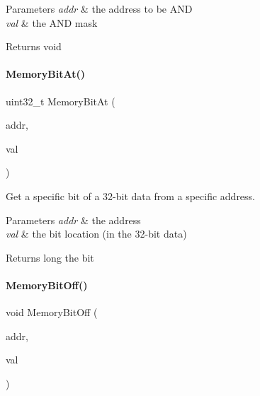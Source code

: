 \begin{DoxyParams}{Parameters}
{\em addr} & the address to be A\+ND \\
\hline
{\em val} & the A\+ND mask \\
\hline
\end{DoxyParams}
\begin{DoxyReturn}{Returns}
void 
\end{DoxyReturn}
\mbox{\label{a00020_aaa87daf3a7b5e127c21919e520e58282}} 
\paragraph{\texorpdfstring{Memory\+Bit\+At()}{MemoryBitAt()}}
{\footnotesize\ttfamily uint32\+\_\+t Memory\+Bit\+At (\begin{DoxyParamCaption}\item[{\mbox{\hyperlink{a00020_a06da901348542a481c297d9b700e2001}{memory\+\_\+addr\+\_\+t}}}]{addr,  }\item[{uint32\+\_\+t}]{val }\end{DoxyParamCaption})\hspace{0.3cm}{\ttfamily [inline]}}



Get a specific bit of a 32-\/bit data from a specific address. 


\begin{DoxyParams}{Parameters}
{\em addr} & the address \\
\hline
{\em val} & the bit location (in the 32-\/bit data) \\
\hline
\end{DoxyParams}
\begin{DoxyReturn}{Returns}
long the bit 
\end{DoxyReturn}
\mbox{\label{a00020_a29fb2c978051c0cff760432e2378f3a3}} 
\paragraph{\texorpdfstring{Memory\+Bit\+Off()}{MemoryBitOff()}}
{\footnotesize\ttfamily void Memory\+Bit\+Off (\begin{DoxyParamCaption}\item[{\mbox{\hyperlink{a00020_a06da901348542a481c297d9b700e2001}{memory\+\_\+addr\+\_\+t}}}]{addr,  }\item[{uint32\+\_\+t}]{val }\end{DoxyParamCaption})\hspace{0.3cm}{\ttfamily [inline]}}



